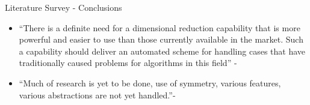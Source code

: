 \begin{frame}[<+-| alert@+>]{Literature Survey - Conclusions}
\begin{itemize}[noitemsep,label=\textbullet,topsep=2pt,parsep=2pt,partopsep=2pt]

\item ``There is a definite need for a dimensional reduction capability that is more powerful and easier to use than those currently available in the market. Such a capability should deliver an automated scheme for handling cases that have traditionally caused problems for algorithms in this field'' - \cite{Stanley2010}

\item ``Much of research is yet to be done, use of symmetry, various features, various abstractions are not yet handled.''- \cite{Smit2011}




\end{itemize}

\def \myfigcommcolumnwidth{0.28}


\end{frame}
